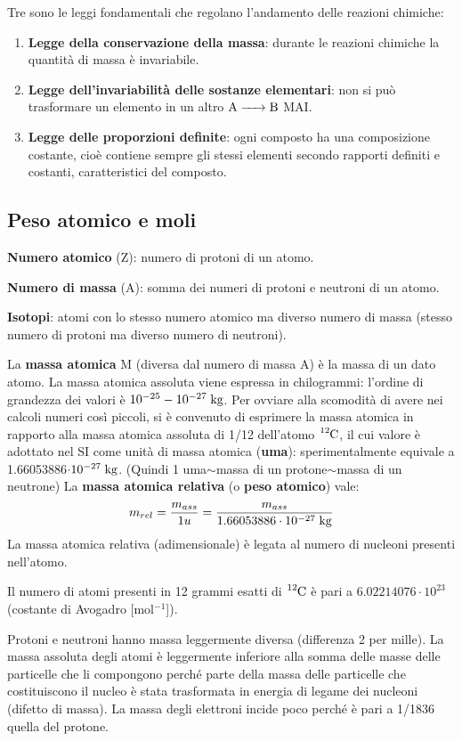 Tre sono le leggi fondamentali che regolano l'andamento delle reazioni chimiche:

\begin{enumerate}
    \item \textbf{Legge della conservazione della massa}: durante le reazioni chimiche la quantità di massa è invariabile.
    \item \textbf{Legge dell'invariabilità delle sostanze elementari}: non si può trasformare un elemento in un altro \(\ce{ A -> B }\) MAI.
    \item \textbf{Legge delle proporzioni definite}: ogni composto ha una composizione costante, cioè contiene sempre gli stessi elementi secondo rapporti definiti e costanti, caratteristici del composto.
\end{enumerate}

\subsection{Peso atomico e moli}
\textbf{Numero atomico} (Z): numero di protoni di un atomo.

\textbf{Numero di massa} (A): somma dei numeri di protoni e neutroni di un
atomo.

\textbf{Isotopi}: atomi con lo stesso numero atomico ma diverso numero di
massa (stesso numero di protoni ma diverso numero di neutroni).

La \textbf{massa atomica} M (diversa dal numero di massa A) è la massa di un dato atomo. La massa atomica assoluta viene espressa in chilogrammi: l'ordine di grandezza dei valori è $10^{-25}-10^{-27} \; \rm kg$. Per ovviare alla scomodità di avere nei calcoli numeri così piccoli, si è convenuto di esprimere la
massa atomica in rapporto alla massa atomica assoluta di 1/12 dell'atomo \(\ce{ ^{12}C }\), il cui valore è adottato nel SI come unità di massa atomica (\textbf{uma}): sperimentalmente equivale a 1.66053886$\cdot
10^{-27} \; \rm kg$. (Quindi 1 uma$\sim$massa di un protone$\sim$massa di un neutrone)
La \textbf{massa atomica relativa} (o \textbf{peso atomico}) vale:
$$m_{rel}=\frac{m_{ass}}{1 u}=\frac{m_{ass}}{1.66053886\cdot
10^{-27} \; \rm kg}$$
La massa atomica relativa (adimensionale) è legata al numero di nucleoni presenti nell'atomo.

Il numero di atomi presenti in 12 grammi esatti di \(\ce{ ^{12}C }\) è pari a $6.02214076\cdot10^{23}$ (costante di Avogadro [mol$^{-1}$]).

Protoni e neutroni hanno massa leggermente diversa (differenza 2 per mille). La massa assoluta degli atomi è leggermente inferiore alla somma delle masse delle particelle che li compongono perché parte della massa delle particelle che costituiscono il nucleo è stata trasformata in energia di legame dei nucleoni (difetto di massa).
La massa degli elettroni incide poco perché è pari a 1/1836 quella del protone.

